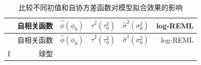 \documentclass[12pt,a4paper,UTF8,twoside]{book}
\theoremstyle{definition}
\theoremstyle{definition}
\theoremstyle{definition}
\theoremstyle{remark}
\begin{document}
\begin{longtable}[]{@{}crrrrr@{}}
\caption{\label{tab:yields-model-compare} 比较不同初值和自协方差函数对模型拟合效果的影响}\tabularnewline
\toprule
\begin{minipage}[b]{0.09\columnwidth}\centering
\strut
\end{minipage} & \begin{minipage}[b]{0.14\columnwidth}\raggedleft
自相关函数\strut
\end{minipage} & \begin{minipage}[b]{0.20\columnwidth}\raggedleft
\(\hat{\phi}(\phi_0)\)\strut
\end{minipage} & \begin{minipage}[b]{0.20\columnwidth}\raggedleft
\(\hat{\tau}^2(\tau^2_{0})\)\strut
\end{minipage} & \begin{minipage}[b]{0.08\columnwidth}\raggedleft
\(\hat{\sigma}^2(\sigma^2_{0})\)\strut
\end{minipage} & \begin{minipage}[b]{0.13\columnwidth}\raggedleft
log-REML\strut
\end{minipage}\tabularnewline
\midrule
\endfirsthead
\toprule
\begin{minipage}[b]{0.09\columnwidth}\centering
\strut
\end{minipage} & \begin{minipage}[b]{0.14\columnwidth}\raggedleft
自相关函数\strut
\end{minipage} & \begin{minipage}[b]{0.20\columnwidth}\raggedleft
\(\hat{\phi}(\phi_0)\)\strut
\end{minipage} & \begin{minipage}[b]{0.20\columnwidth}\raggedleft
\(\hat{\tau}^2(\tau^2_{0})\)\strut
\end{minipage} & \begin{minipage}[b]{0.08\columnwidth}\raggedleft
\(\hat{\sigma}^2(\sigma^2_{0})\)\strut
\end{minipage} & \begin{minipage}[b]{0.13\columnwidth}\raggedleft
log-REML\strut
\end{minipage}\tabularnewline
\midrule
\endhead
\begin{minipage}[t]{0.09\columnwidth}\centering
I\strut
\end{minipage} & \begin{minipage}[t]{0.14\columnwidth}\raggedleft
球型\strut
\end{minipage} & \begin{minipage}[t]{0.20\columnwidth}\raggedleft

\end{minipage}
\end{longtable}
\end{document}
